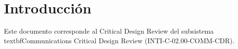 \section{Introducción}
Este documento corresponde al Critical Design Review del subsistema \\textbf{Communications Critical Design Review} (INTI-C-02.00-COMM-CDR).

